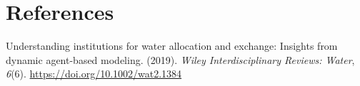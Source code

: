 \documentclass[10pt]{article}
\begin{document}
\FloatBarrier
\section*{References}\sloppy
{}
\label{csl:1}{Understanding institutions for water allocation and exchange: Insights from dynamic agent-based modeling}. (2019). \textit{Wiley Interdisciplinary Reviews: Water}, \textit{6}(6). \url{https://doi.org/10.1002/wat2.1384}
\end{document}

